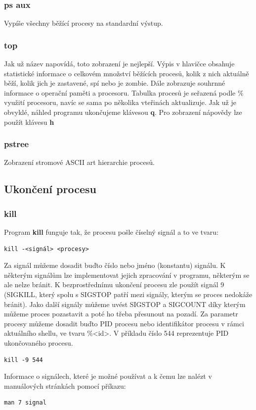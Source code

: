 \documentclass{article}
\begin{document}
\subsubsection{ps aux}
Vypíše všechny běžící procesy na standardní výstup. 
\subsubsection{top}
Jak už název napovídá, toto zobrazení je nejlepší. Výpis v hlavičce obsahuje statistické informace o celkovém množství běžících procesů, kolik z nich aktuálně běží, kolik jich je zastavené, spí nebo je zombie. Dále zobrazuje souhrnné informace o operační paměti a procesoru. Tabulka procesů je seřazená podle \% využití procesoru, navíc se sama po několika vteřinách aktualizuje. Jak už je obvyklé, náhled programu ukončujeme klávesou \textbf{q}. Pro zobrazení nápovědy lze použít klávesu \textbf{h}
\subsubsection{pstree}
Zobrazení stromové ASCII art hierarchie procesů.

\subsection{Ukončení procesu}
\subsubsection{kill}
Program \textbf{kill} funguje tak, že procesu pošle číselný signál a to ve tvaru:
\begin{verbatim}
kill -<signál> <procesy>
\end{verbatim} 
Za signál můžeme dosadit buďto číslo nebo jméno (konstantu) signálu. K některým signálům lze implementovat jejich zpracování v programu, některým se ale nelze bránit. K bezprostřednímu ukončení procesu zle použít signál 9 (SIGKILL, který spolu s SIGSTOP patří mezi signály, kterým se proces nedokáže bránit). Jako další signály můžeme uvést SIGSTOP a SIGCOUNT díky kterým můžeme proces pozastavit a poté ho třeba přesunout na pozadí. Za parametr procesy můžeme dosadit buďto PID procesu nebo identifikátor procesu v rámci aktuálního shellu, ve tvaru \%\textless id\textgreater. V příkladu číslo 544 reprezentuje PID ukončovaného procesu.
\begin{verbatim}
kill -9 544 
\end{verbatim}

Informace o signálech, které je možné používat a k čemu lze nalézt v manuálových stránkách pomocí příkazu:
\begin{verbatim}
man 7 signal
\end{verbatim}
\end{document}
